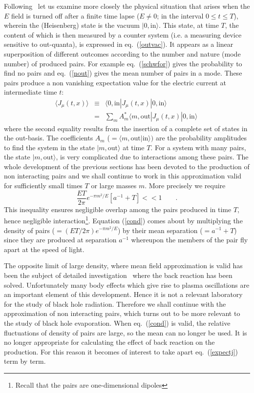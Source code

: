 \documentclass[12pt,oneside]{report}
\def\ket#1{|#1\rangle}
\def\elematrice#1#2#3{\langle #1|#2|#3 \rangle}
\begin{document}
 
Following~\cite{BMPPS} let 
us examine more closely the physical situation that arises 
when the $E$ field is  turned off after
a finite time lapse ($E\neq 0$; in the interval $0\leq t \leq T$), wherein
the (Heisenberg)
state is the vacuum $|0,\mbox{in}\rangle$. This state, at time $T$, the content of
which is then
 measured by a counter system (i.e. a measuring device sensitive to
out-quanta), is
expressed in eq.~(\ref{outvac}). It appears as a linear superposition of
 different
outcomes according
 to the number and nature (mode number) of produced pairs.
For example eq.~(\ref{schwfor}) gives the 
probability to find no pairs and eq.~(\ref{nout}) gives the mean number of pairs in
a mode. These pairs produce a non vanishing expectation value for the
electric current at intermediate time $t$:
\begin{eqnarray}
\langle J_{\mu}(t,x) \rangle &\equiv&\elematrice{0,\mbox{in}}
{J_{\mu}(t,x)}{0,\mbox{in}}\nonumber \\
&=&\sum_{m}A_{m}^{*}\elematrice{m,\mbox{out}}{J_{\mu}(t,x)}
{0,\mbox{in}}\
\label{expectj}
\end{eqnarray}
where the second equality results from 
the insertion of  a complete set of states in the out-basis. The coefficients
$A_{m}$ ($=\langle m ,\mbox{out}|\mbox{in}\rangle)$ 
are the probability amplitudes to find the system in the state
$\ket{m,\mbox{out}}$ at time
$T$. For a system with many pairs, the state $\ket{m,\mbox{out}}$, is very
complicated due to
interactions among these pairs. The whole development of the previous
sections has been
devoted to the production of non interacting pairs and we shall continue to
work in this
approximation valid for sufficiently small times $T$ or large masses $m$.
More precisely we require 
\begin{equation}
\frac {ET}{2\pi}e^{-\pi m^2/E}[a^{-1}+T]<<1\qquad .\label{cond}
\end {equation}
This inequality ensures negligible overlap among the pairs produced in time
$T$, hence
negligible interaction\footnote {Recall that the pairs are one-dimensional
dipoles}.
Equation (\ref{cond}) comes about by multiplying the density of pairs
($=(ET/2\pi)e^{-\pi m^2/E}$) by their mean separation ($=a^{-1}+T$) since they are
produced at
separation $a^{-1}$ whereupon the members of the pair fly apart at the
speed of light.
\par The opposite limit of large density, where mean field approximation is
valid has been the
subject of detailed investigation~\cite{CoMo}
 where the back reaction has been solved.
Unfortunately
many body effects which give rise to plasma oscillations are an important
element of this
development. Hence it is not a relevant laboratory for the study of black
hole radiation.
Therefore we shall continue with the approximation of 
non interacting pairs, which turns out to
be more 
relevant to the study of black hole evaporation.
When eq.~(\ref{cond}) is valid, the relative fluctuations
of density of pairs 
are large, so the mean can no longer be used. It
is no longer appropriate
for calculating the effect of back reaction on the production. 
For this reason
it becomes of interest to take apart eq.~(\ref{expectj}) term by term.
\end{document}

